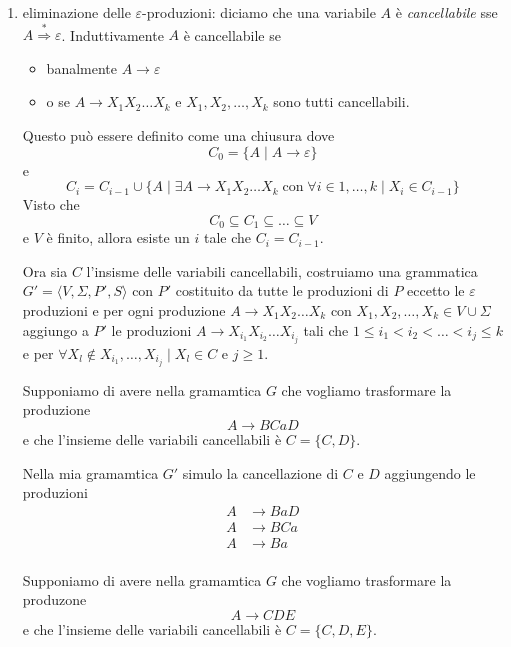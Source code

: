\documentclass[12pt]{report}
\theoremstyle{definition}
\begin{document}
\begin{enumerate}
	\item eliminazione delle $\varepsilon$-produzioni: diciamo che una variabile $A$ è \textit{cancellabile} sse $A \overset{*}{\Rightarrow} \varepsilon$.
		Induttivamente $A$ è cancellabile se
		\begin{itemize}
			\item banalmente $A \rightarrow \varepsilon$
			\item o se $A \rightarrow X_1 X_2 \dots X_k$ e $X_1, X_2, \dots, X_k$ sono tutti cancellabili.
		\end{itemize}
		Questo può essere definito come una chiusura dove
		$$ C_0 = \{ A \mid A \rightarrow \varepsilon \} $$
		e 
		$$ C_i = C_{i - 1} \cup \{ A \mid \exists A \rightarrow X_1 X_2 \dots X_k \; \text{con} \; \forall i \in 1, \dots, k \mid X_i \in C_{i - 1} \} $$
		Visto che
		$$ C_0 \subseteq C_1 \subseteq \dots \subseteq V $$
		e $V$ è finito, allora esiste un $i$ tale che $C_i = C_{i - 1}$.

		Ora sia $C$ l'insisme delle variabili cancellabili, costruiamo una grammatica $G' = \langle V, \Sigma, P', S \rangle$ con $P'$ costituito da tutte le produzioni di $P$ eccetto le $\varepsilon$ produzioni e per ogni produzione $A \rightarrow X_1 X_2 \dots X_k$ con $X_1, X_2, \dots, X_k \in V \cup \Sigma$ aggiungo a $P'$ le produzioni $A \rightarrow X_{i_1} X_{i_2} \dots X_{i_j}$ tali che $1 \leq i_1 < i_2 < \dots < i_j \leq k$ e per $\forall X_l \not \in X_{i_1}, \dots, X_{i_j} \mid X_l \in C$ e $j \geq 1$.

		\begin{tcolorbox}
			Supponiamo di avere nella gramamtica $G$ che vogliamo trasformare la produzione
			$$ A \rightarrow B C a D $$
			e che l'insieme delle variabili cancellabili è $C = \{C, D\}$.

			Nella mia gramamtica $G'$ simulo la cancellazione di $C$ e $D$ aggiungendo le produzioni
			\begin{align*}
				A &\rightarrow B a D \\
				A &\rightarrow B C a \\
				A &\rightarrow B a \\
			\end{align*}
		\end{tcolorbox}

		\begin{tcolorbox}
			Supponiamo di avere nella gramamtica $G$ che vogliamo trasformare la produzone
			$$ A \rightarrow C D E $$
			e che l'insieme delle variabili cancellabili è $C = \{C, D, E\}$.


\end{tcolorbox}
\end{enumerate}
\end{document}
